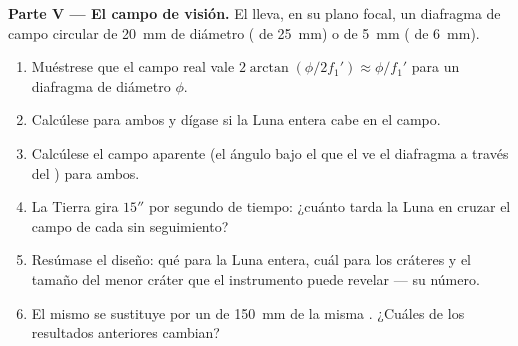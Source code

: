 \begin{problem}
\medskip
\noindent\textbf{Parte V --- El campo de visión.}
El  lleva, en su plano focal, un diafragma de campo circular de
\qty{20}{mm} de diámetro ( de \qty{25}{mm}) o de \qty{5}{mm}
( de \qty{6}{mm}).
\begin{enumerate}[resume]
  \item Muéstrese que el campo real vale $2\arctan(\phi/2f_1')
        \approx \phi/f_1'$ para un diafragma de diámetro $\phi$.
  \item Calcúlese para ambos  y dígase si la Luna entera cabe en
        el campo.
  \item Calcúlese el campo aparente (el ángulo bajo el que el  ve el
        diafragma a través del ) para ambos.
  \item La Tierra gira $15''$ por segundo de tiempo: ¿cuánto tarda la Luna
        en cruzar el campo de cada  sin seguimiento?
  \item Resúmase el diseño: qué  para la Luna entera, cuál para los
        cráteres y el tamaño del menor cráter que el instrumento puede
        revelar --- su número.
  \item El mismo  se sustituye por un  de
        \qty{150}{mm} de la misma . ¿Cuáles de los
        resultados anteriores cambian?
\end{enumerate}
\end{problem}
